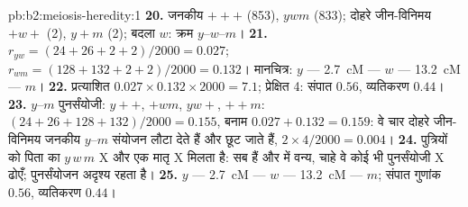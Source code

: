 \begin{solution}{pb:b2:meiosis-heredity:1}
\textbf{20.} जनकीय $+++$ (853), $ywm$ (833); दोहरे जीन-विनिमय
$+w+$ (2), $y+m$ (2); बदला $w$: क्रम $y$--$w$--$m$।
\textbf{21.} $r_{yw} = (24 + 26 + 2 + 2)/2000 = 0.027$; $r_{wm} = (128
+ 132 + 2 + 2)/2000 = 0.132$। मानचित्र: $y$ --- \qty{2.7}{cM} --- $w$ ---
\qty{13.2}{cM} --- $m$।
\textbf{22.} प्रत्याशित $0.027\times 0.132\times 2000 = 7.1$; प्रेक्षित
4: संपात $0.56$, व्यतिकरण $0.44$।
\textbf{23.} $y$--$m$ पुनर्संयोजी: $y++$, $+wm$, $yw+$, $++m$: $(24 +
26 + 128 + 132)/2000 = 0.155$, बनाम $0.027 + 0.132 = 0.159$: वे
चार दोहरे जीन-विनिमय जनकीय $y$--$m$ संयोजन लौटा देते हैं और छूट जाते
हैं, $2\times 4/2000 = 0.004$।
\textbf{24.} पुत्रियों को पिता का $y\,w\,m$ X और एक
मातृ X मिलता है: सब  हैं और  में वन्य, चाहे वे
कोई भी पुनर्संयोजी X ढोएँ; पुनर्संयोजन अदृश्य रहता है।
\textbf{25.} $y$ --- \qty{2.7}{cM} --- $w$ --- \qty{13.2}{cM} --- $m$;
संपात गुणांक $0.56$, व्यतिकरण $0.44$।
\end{solution}
